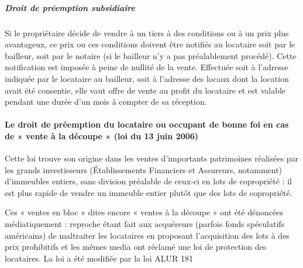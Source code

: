 				\subparagraph{Droit de préemption subsidiaire} Si le propriétaire décide de vendre à un tiers à des conditions ou à un
				prix plus avantageux, ce prix ou ces conditions doivent être notifiés au locataire soit par le bailleur, soit
				par le notaire (si le bailleur n'y a pas préalablement procédé). Cette notification est imposée à peine de
				nullité de la vente. Effectuée soit à l'adresse indiquée par le locataire au bailleur, soit à l'adresse des locaux
				dont la location avait été consentie, elle vaut offre de vente au profit du locataire et est valable pendant
				une durée d'un mois à compter de sa réception.
			
			\paragraph{Le droit de préemption du locataire ou occupant de bonne foi en cas de « vente à la	découpe » (loi  du 13 juin 2006)}
			
			\par
			Cette loi trouve son origine dans les ventes d’importants patrimoines réalisées par les grands investisseurs
			(Établissements Financiers et Assureurs, notamment) d’immeubles entiers, sans division préalable de
			ceux-ci en lots de copropriété : il est plus rapide de vendre un immeuble entier plutôt que des lots de
			copropriété.
			
			Ces « ventes en bloc » dites encore « ventes à la découpe » ont été dénoncées médiatiquement :
			reproche étant fait aux acquéreurs (parfois fonds spéculatifs américains) de maltraiter les locataires en
			proposant l’acquisition des lots à des prix prohibitifs et les mêmes media ont réclamé une loi de protection
			des locataires. La loi a été modifiée par la loi ALUR
			181 


